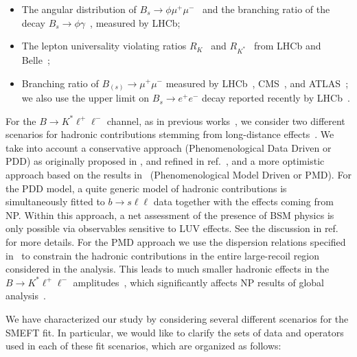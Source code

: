 \begin{itemize}
	\item The angular distribution of $B_s\to \phi\mu^+\mu^-$~\cite{Aaij:2015esa} and the branching ratio of  the decay $B_s\to\phi\gamma$~\cite{Aaij:2012ita}, measured by LHCb;
	\item The lepton universality violating ratios $R_K$~\cite{Aaij:2019wad} and $R_{K^*}$~\cite{Aaij:2017vbb} from LHCb and Belle~\cite{Abdesselam:2019wac};
	\item Branching ratio of $B_{(s)}\to \mu^+\mu^-$ measured by LHCb~\cite{Aaij:2017vad}, CMS~\cite{Chatrchyan:2013bka}, and ATLAS~\cite{Aaboud:2018mst}; we also use the upper limit on $B_s\to e^+e^-$ decay reported recently by LHCb~\cite{Aaij:2020nol}. 
\end{itemize}

For the $B\to K^*\ell^+\ell^-$ channel, as in previous works~\cite{Ciuchini:2016weo,Ciuchini:2017mik,Ciuchini:2017gva,Ciuchini:2018xll,Ciuchini:2018anp,Ciuchini:2019usw}, we consider two different scenarios for hadronic contributions stemming from long-distance effects~\cite{Khodjamirian:2010vf,Jager:2014rwa,Lyon:2014hpa}. We take into account a conservative approach (Phenomenological Data Driven or PDD) as originally proposed in \cite{Ciuchini:2015qxb}, and refined in ref.~\cite{Ciuchini:2018anp}, and a more optimistic approach based on the results in~\cite{Khodjamirian:2010vf} (Phenomenological Model Driven or PMD). For the PDD model, a quite generic model of hadronic contributions is simultaneously fitted to $b \to s \ell \ell$ data together with the effects coming from NP. Within this approach, a net assessment of the presence of BSM physics is only possible via observables sensitive to LUV effects. See the discussion in ref.~\cite{Ciuchini:2019usw} for more details. For the PMD approach we use the dispersion relations specified in~\cite{Khodjamirian:2010vf} to constrain the hadronic contributions in the entire large-recoil region considered in the analysis. This leads to much smaller hadronic effects in the~$B\to K^*\ell^+\ell^-$ amplitudes~\cite{Ciuchini:2016weo}, which significantly affects NP results of global analysis~\cite{Ciuchini:2019usw}.

We have characterized our study by considering several different scenarios for the SMEFT fit. In particular, we would like to clarify the sets of data and operators used in each of these fit scenarios, which are organized as follows:


